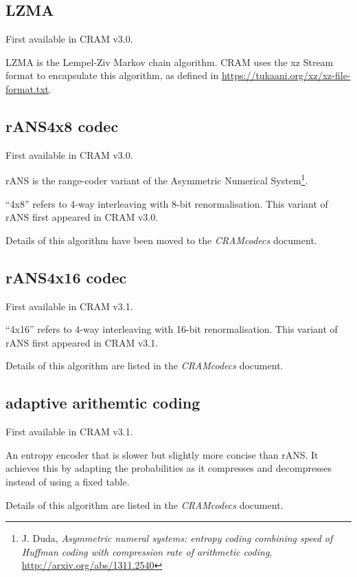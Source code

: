 \documentclass[a4paper]{article}
\begin{document}
\subsection{LZMA}

First available in CRAM v3.0.

LZMA is the Lempel-Ziv Markov chain algorithm.
CRAM uses the xz Stream format to encapsulate this algorithm, as defined in \url{https://tukaani.org/xz/xz-file-format.txt}.

\subsection{rANS4x8 codec}

First available in CRAM v3.0.

rANS is the range-coder variant of the Asymmetric Numerical
System\footnote{J. Duda, \textit{Asymmetric numeral systems: entropy
    coding combining speed of Huffman coding with compression rate of
    arithmetic coding}, \url{http://arxiv.org/abs/1311.2540}}.

``4x8'' refers to 4-way interleaving with 8-bit renormalisation.\newline
This variant of rANS first appeared in CRAM v3.0.

Details of this algorithm have been moved to the \textit{CRAMcodecs} document.

\subsection{rANS4x16 codec}

First available in CRAM v3.1.

``4x16'' refers to 4-way interleaving with 16-bit renormalisation.\newline
This variant of rANS first appeared in CRAM v3.1.

Details of this algorithm are listed in the \textit{CRAMcodecs} document.

\subsection{adaptive arithemtic coding}

First available in CRAM v3.1.

An entropy encoder that is slower but slightly more concise than
rANS.  It achieves this by adapting the probabilities as it compresses
and decompresses instead of using a fixed table.

Details of this algorithm are listed in the \textit{CRAMcodecs} document.
\end{document}
